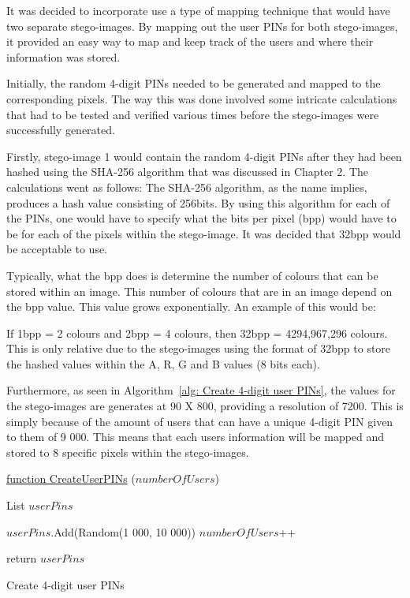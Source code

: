 It was decided to incorporate use a type of mapping technique that would have two separate stego-images. By mapping out the user PINs for both stego-images, it provided an easy way to map and keep track of the users and where their information was stored. 

Initially, the random 4-digit PINs needed to be generated and mapped to the corresponding pixels. The way this was done involved some intricate calculations that had to be tested and verified various times before the stego-images were successfully generated. 

Firstly, stego-image 1 would contain the random 4-digit PINs after they had been hashed using the SHA-256 algorithm that was discussed in Chapter 2. The calculations went as follows:
The SHA-256 algorithm, as the name implies, produces a hash value consisting of 256bits. 
By using this algorithm for each of the PINs, one would have to specify what the bits per pixel (bpp) would have to be for each of the pixels within the stego-image. It was decided that 32bpp would be acceptable to use. 

Typically, what the bpp does is determine the number of colours that can be stored within an image. This number of colours that are in an image depend on the bpp value. This value grows exponentially. An example of this would be: 

If 1bpp = 2 colours and 2bpp = 4 colours, then 32bpp = 4294,967,296 colours. This is only relative due to the stego-images using the format of 32bpp to store the hashed values within the A, R, G and B values (8 bits each).

Furthermore, as seen in Algorithm~\ref{alg: Create 4-digit user PINs}, the values for the stego-images are generates at 90 X 800, providing a resolution of 7200. This is simply because of the amount of users that can have a unique 4-digit PIN given to them of 9 000. This means that each users information will be mapped and stored to 8 specific pixels within the stego-images. 



\begin{algorithm}
     
     \underline{function CreateUserPINs} ($numberOfUsers$)\;
     
     List $userPins$ \;
     
     {
        $userPins$.Add(Random(1 000, 10 000))\;
        $numberOfUsers$++\;
     }
     
     return $userPins$\;
     \caption{Create 4-digit user PINs}
     \label{alg: Create 4-digit user PINs}
     
\end{algorithm}

